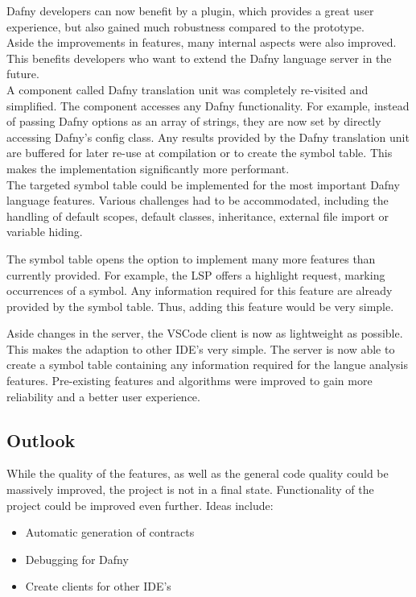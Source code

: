 Dafny developers can now benefit by a plugin, which provides a great user experience, but also gained much robustness compared to the prototype.\\

Aside the improvements in features, many internal aspects were also improved.
This benefits developers who want to extend the Dafny language server in the future.\\

A component called Dafny translation unit was completely re-visited and simplified.
The component accesses any Dafny functionality.
For example, instead of passing Dafny options as an array of strings, they are now set by
directly accessing Dafny's config class.
Any results provided by the Dafny translation unit are buffered for later re-use at compilation or to create the symbol table.
This makes the implementation significantly more performant.\\

The targeted symbol table could be implemented for the most important Dafny language features.
Various challenges had to be accommodated, including the handling of default scopes, default classes, inheritance, external file import or variable hiding.

The symbol table opens the option to implement many more features than currently provided.
For example, the LSP offers a highlight request, marking occurrences of a symbol.
Any information required for this feature are already provided by the symbol table.
Thus, adding this feature would be very simple.

Aside changes in the server, the VSCode client is now as lightweight as possible.
This makes the adaption to other IDE's very simple.
The server is now able to create a symbol table containing any information required for the langue analysis features.
Pre-existing features and algorithms were improved to gain more reliability and a better user experience.

\subsection{Outlook}
While the quality of the features, as well as the general code quality could be massively improved, the project is not in a final state.
Functionality of the project could be improved even further.
Ideas include:
\begin{itemize}
    \item Automatic generation of contracts
    \item Debugging for Dafny
    \item Create clients for other IDE's
\end{itemize}

